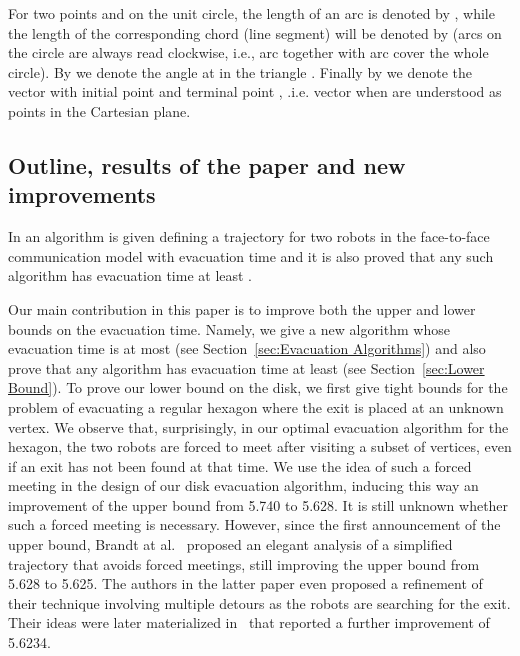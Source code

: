 \documentclass[
final
]{dmtcs-episciences}
\newcommand{\ff}{face-to-face }
\theoremstyle{definition}
\begin{document}
For two points  and  on the unit circle, the length of an arc  is denoted by , 
while the length of the corresponding chord (line segment) will be denoted by  
(arcs on the circle are always read clockwise, i.e., arc  together with arc  cover the whole circle). 
By  we denote the angle at  in the triangle . Finally by  we denote the vector with initial point  and terminal point , .i.e. vector  when  are understood as points in the Cartesian plane. 












\subsection{Outline, results of the paper and new improvements}

In \cite{CGGKMP} an algorithm is given defining a
trajectory for two robots in the \ff communication
model with evacuation time
 and it is also proved that any such algorithm has evacuation 
time at least .

Our main contribution in this paper is to improve both the upper and lower bounds
on the evacuation time. Namely,
we give a new algorithm whose evacuation time is at most 
(see Section~\ref{sec:Evacuation Algorithms})
and also prove that any algorithm has evacuation 
time at least 
(see Section~\ref{sec:Lower Bound}).
To prove our lower bound on the disk, we first give tight bounds for the problem of evacuating a regular hexagon where the exit is placed at an unknown vertex. 
We observe that, surprisingly, in our optimal evacuation algorithm for the hexagon, the two robots are forced to meet after visiting a subset of vertices, even if an exit has not been found at that time. 
We use the idea of such a forced meeting in the design of our disk evacuation algorithm, inducing this way an improvement of the upper bound from 5.740 to 5.628. 
It is still unknown  whether such a forced meeting is necessary. However, since the first announcement of the upper bound, Brandt at al.~\cite{Watten2017} proposed an elegant analysis of a simplified trajectory that avoids forced meetings, still improving the upper bound from 5.628 to 5.625. The authors in the latter paper even proposed a refinement of their technique involving multiple detours as the robots are searching for the exit. Their ideas were later materialized in~\cite{disser2019evacuating} that reported a further improvement of 5.6234.
\end{document}
